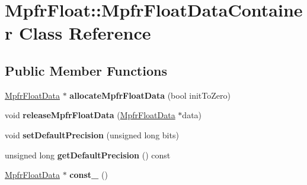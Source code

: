 \hypertarget{class_mpfr_float_1_1_mpfr_float_data_container}{}\section{Mpfr\+Float\+:\+:Mpfr\+Float\+Data\+Container Class Reference}
\label{class_mpfr_float_1_1_mpfr_float_data_container}
\subsection*{Public Member Functions}
\begin{DoxyCompactItemize}
\item 
\mbox{\label{class_mpfr_float_1_1_mpfr_float_data_container_a01979bbcc53978597cb73cc8571b7aca}} 
\hyperlink{struct_mpfr_float_1_1_mpfr_float_data}{Mpfr\+Float\+Data} $\ast$ {\bfseries allocate\+Mpfr\+Float\+Data} (bool init\+To\+Zero)
\item 
\mbox{\label{class_mpfr_float_1_1_mpfr_float_data_container_ac54285f91e4a44f5e515df17d80b5027}} 
void {\bfseries release\+Mpfr\+Float\+Data} (\hyperlink{struct_mpfr_float_1_1_mpfr_float_data}{Mpfr\+Float\+Data} $\ast$data)
\item 
\mbox{\label{class_mpfr_float_1_1_mpfr_float_data_container_a2d6cac131b73904f175cfd6bc9fe60db}} 
void {\bfseries set\+Default\+Precision} (unsigned long bits)
\item 
\mbox{\label{class_mpfr_float_1_1_mpfr_float_data_container_a489be7b21d575e1b9047dbd977639b03}} 
unsigned long {\bfseries get\+Default\+Precision} () const
\item 
\mbox{\label{class_mpfr_float_1_1_mpfr_float_data_container_a10b2f3355258bf989a9309db255f7d03}} 
\hyperlink{struct_mpfr_float_1_1_mpfr_float_data}{Mpfr\+Float\+Data} $\ast$ {\bfseries const\+\_} ()
\item 
\mbox{\label{class_mpfr_float_1_1_mpfr_float_data_container_ade3aa655f2b199aa7aa8029667253c91}} 

\end{DoxyCompactItemize}
